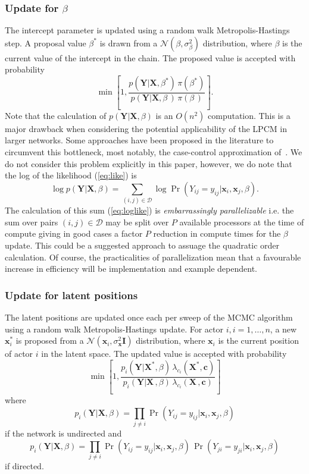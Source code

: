 \documentclass[12pt]{article}
\newcommand{\x}{{\mathbf{x}}}
\newcommand{\bX}{{\mathbf{X}}}
\newcommand{\bY}{{\mathbf{Y}}}
\newcommand{\Y}{{\mathbf{Y}}}
\newcommand{\bc}{{\mathbf{c}}}
\newcommand{\I}{{\mathbf{I}}}
\begin{document}
\subsubsection{ Update for $\beta$} \label{sec:betaupdate}
The intercept parameter is updated using a random walk Metropolis-Hastings step. A proposal value $\beta^*$ is drawn from a $\mathcal{N}(\beta,\sigma_{\beta}^2)$  distribution, where $\beta$ is the current value of the intercept in the chain. The proposed value is accepted with probability \[\min\left[1, \frac{p(\Y|\bX, \beta^*)\,\pi(\beta^*)}{p(\Y|\bX, \beta\,)\,\pi(\beta\,)}\right].\]
Note that  the calculation of $p(\Y|\bX, \beta)$ is an $O(n^2)$ computation. This is a major drawback when considering the potential applicability of the LPCM in larger networks. 
Some approaches have been proposed in the literature to circumvent this bottleneck, most notably, the case-control approximation of~. We do not consider this problem explicitly in this paper, however, we do note that the log of the likelihood (\ref{eq:like}) is
\begin{equation}
\log p(\bY|\bX, \beta) = \sum_{(i,j) \in \mathcal{D}} \log \Pr\left( Y_{ij} = y_{ij} | \x_i, \x_j, \beta \right). \label{eq:loglike}
\end{equation}
The calculation of this sum (\ref{eq:loglike}) is {\it embarrassingly parallelizable} i.e. the sum over pairs $(i,j) \in \mathcal{D}$ may be split over $P$ available processors at the time of compute giving in good cases a factor $P$ reduction in compute times for the $\beta$ update. This could be a suggested approach to assuage the quadratic order calculation. Of course, the practicalities of parallelization mean that a favourable increase in efficiency will be implementation and example dependent.


\subsubsection{ Update for latent positions}

The latent positions are updated once each per sweep of the MCMC algorithm using a random walk Metropolis-Hastings update. For actor $i, i=1,\dots,n$, a new $\x_i^*$ is proposed from a $\mathcal{N}(\x_i, \sigma_{\x}^2 \I )$ distribution, where $\x_i$ is the current position of actor $i$ in the latent space. The updated value is accepted with probability
\[
\min\left[ 1, \frac{p_i(\Y|\bX^*,\beta)\,\lambda_{c_i}( \bX^*, \bc) }{p_i(\Y|\bX\,,\beta)\,\lambda_{c_i}( \bX\,, \bc)} \right]
\] 
where
\[
p_i(\Y|\bX,\beta) = \prod_{j \ne i} \Pr( Y_{ij} = y_{ij} | \x_i, \x_j, \beta )
\]
if the network is undirected and
\[
p_i(\Y|\bX,\beta) = \prod_{j \ne i} \Pr( Y_{ij} = y_{ij} | \x_i, \x_j, \beta ) \,\Pr( Y_{ji} = y_{ji} | \x_i, \x_j, \beta )
\]
if directed.
\end{document}
